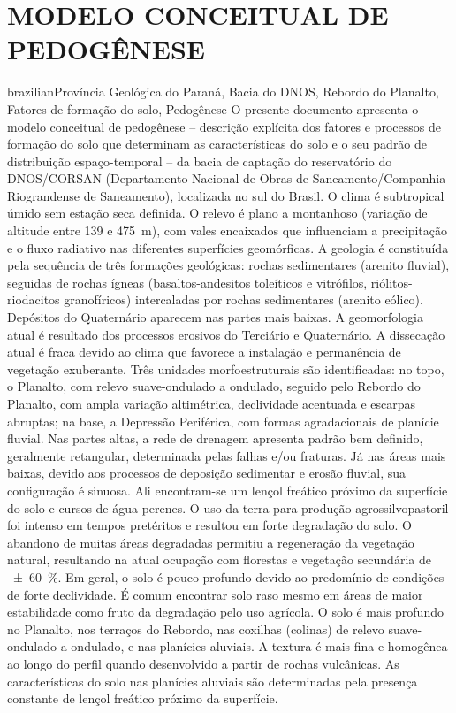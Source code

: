 \artigotrue
\chapter{MODELO CONCEITUAL DE PEDOGÊNESE}
\label{chap:chap03}


\def\ptkeys{Província Geológica do Paraná, Bacia do DNOS, Rebordo do Planalto, Fatores de formação do solo, 
Pedogênese}

\begin{chapterabstract}{brazilian}{\ptkeys}
O presente documento apresenta o modelo conceitual de pedogênese -- descrição explícita dos fatores e 
processos de formação do solo que determinam as características do solo e o seu padrão de distribuição 
espaço-temporal -- da bacia de captação do reservatório do DNOS/CORSAN (Departamento Nacional de Obras de 
Saneamento/Companhia Riograndense de Saneamento), localizada no sul do Brasil. O clima é 
subtropical úmido sem estação seca definida. O relevo é plano a montanhoso (variação de altitude entre 139 e 
\SI{475}{\m}), com vales encaixados que influenciam a precipitação e o fluxo radiativo nas diferentes 
superfícies geomórficas. A geologia é constituída pela sequência de três formações geológicas: rochas 
sedimentares 
(arenito fluvial), seguidas de rochas ígneas (basaltos-andesitos toleíticos e vitrófilos, riólitos-riodacitos 
granofíricos) intercaladas por rochas sedimentares (arenito eólico). Depósitos do Quaternário aparecem nas 
partes mais baixas. A geomorfologia atual é resultado dos processos erosivos do Terciário e Quaternário. A 
dissecação atual é fraca devido ao clima que favorece a instalação e permanência de vegetação exuberante. Três 
unidades morfoestruturais são identificadas: no topo, o Planalto, com relevo suave-ondulado a ondulado, 
seguido pelo Rebordo do Planalto, com ampla variação altimétrica, declividade acentuada e escarpas abruptas; na 
base, a Depressão Periférica, com formas agradacionais de planície fluvial. Nas partes altas, a rede de 
drenagem apresenta padrão bem definido, geralmente retangular, determinada pelas falhas e/ou fraturas. Já nas 
áreas mais baixas, devido aos processos de deposição sedimentar e erosão fluvial, sua configuração é sinuosa. 
Ali 
encontram-se um lençol freático próximo da superfície do solo e cursos de água perenes. O uso da terra para 
produção agrossilvopastoril foi intenso em tempos pretéritos e resultou em forte degradação do solo. O 
abandono 
de muitas áreas degradadas permitiu a regeneração da vegetação natural, resultando na atual ocupação com 
florestas e vegetação secundária de \SI{\pm60}{\percent}. Em geral, o solo é pouco profundo devido ao 
predomínio de condições de forte declividade. É comum encontrar solo raso mesmo em áreas de maior estabilidade 
como fruto da degradação pelo uso agrícola. O solo é mais profundo no Planalto, nos terraços do Rebordo, nas 
coxilhas (colinas) de relevo suave-ondulado a ondulado, e nas planícies aluviais. A textura é mais fina e 
homogênea ao 
longo do perfil quando desenvolvido a partir de rochas vulcânicas. As características do solo nas planícies 
aluviais são determinadas pela presença constante de lençol freático próximo da superfície.
\end{chapterabstract}

